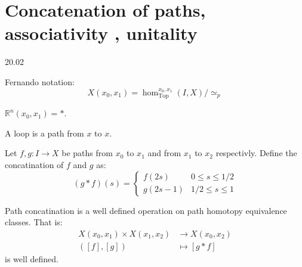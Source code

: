 \section{Concatenation of paths, associativity , unitality}
20.02

\begin{definition}
    Fernando notation:
    \[
      X(x_0, x_1) = \hom_{\text{Top}}^{x_0,x_1}(I, X) / \simeq_p
    \]
\end{definition}


\begin{example}
    \( \mathbb{R}^n(x_0, x_1) = * \).
\end{example}

\begin{definition}[loop]
    A loop is a path from \( x \) to \( x \).
\end{definition}

\begin{definition}
   Let \( f, g: I \to X \) be paths from
   \( x_0  \) to \( x_1 \) and from \( x_1 \)
   to \( x_2 \) respectivly.
   Define the concatination of \( f \) and \( g \) as:
  \begin{equation}
      (g * f)(s) = \begin{cases}
          f(2s) & 0 \le s \le 1/2 \\
          g(2s - 1) & 1/2 \le s \le 1
      \end{cases}
  \end{equation}
\end{definition}

\begin{proposition}
    Path concatination is a well defined operation
    on path homotopy equivalence classes. That is:
    \begin{align*}
      X(x_0,x_1) \times X(x_1, x_2) &\longrightarrow X(x_0, x_2) \\
      ([f], [g]) &\longmapsto [g * f]
    \end{align*}
    is well defined.
\end{proposition}

